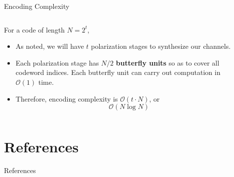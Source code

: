 \documentclass[8pt, compress]{beamer}
\begin{document}
\begin{frame}{Encoding Complexity}
    \begin{columns}
    \begin{column}{0.6\linewidth}
    For a code of length $N = 2^t$,
    \begin{itemize}
        \item<1-> As noted, we will have $t$ polarization stages to synthesize our channels.
        \item<2-> Each polarization stage has $N/2$ \textbf{butterfly units} so as to cover all codeword indices. Each butterfly unit can carry out computation in $\mathcal{O}(1)$ time.
        \item<3-> Therefore, encoding complexity is $\mathcal{O}(t\cdot N)$, or $$\mathcal{O}(N \log N)$$
        
    \end{itemize}
    \end{column}
    \begin{column}{0.4\linewidth}
    
    \end{column}
    \end{columns}
    
\end{frame}

\appendix
\section*{References}
\begin{frame}{References}

  
\end{frame}
\end{document}
